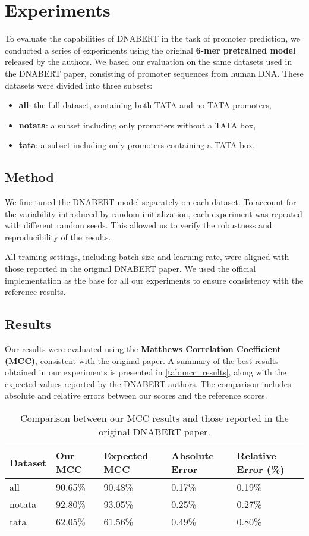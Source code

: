 \section{Experiments}

To evaluate the capabilities of DNABERT in the task of promoter prediction, we conducted a series of experiments using the original \textbf{6-mer pretrained model} released by the authors. We based our evaluation on the same datasets used in the DNABERT paper, consisting of promoter sequences from human DNA. These datasets were divided into three subsets:
\begin{itemize}
\item \textbf{all}: the full dataset, containing both TATA and no-TATA promoters,
\item \textbf{notata}: a subset including only promoters without a TATA box,
\item \textbf{tata}: a subset including only promoters containing a TATA box.
\end{itemize}

\subsection{Method}

We fine-tuned the DNABERT model separately on each dataset. To account for the variability introduced by random initialization, each experiment was repeated with different random seeds. This allowed us to verify the robustness and reproducibility of the results.

All training settings, including batch size and learning rate, were aligned with those reported in the original DNABERT paper. We used the official implementation as the base for all our experiments to ensure consistency with the reference results.

\subsection{Results}

Our results were evaluated using the \textbf{Matthews Correlation Coefficient (MCC)}, consistent with the original paper. A summary of the best results obtained in our experiments is presented in \autoref{tab:mcc_results}, along with the expected values reported by the DNABERT authors. The comparison includes absolute and relative errors between our scores and the reference scores.

\begin{table*}[h!]
\centering
\begin{tabular}{|l|l|l|l|l|}
\hline
Dataset & Our MCC & Expected MCC & Absolute Error & Relative Error (\%) \\
\hline
all & 90.65\% & 90.48\% & 0.17\% & 0.19\% \\
notata & 92.80\% & 93.05\% & 0.25\% & 0.27\% \\
tata & 62.05\% & 61.56\% & 0.49\% & 0.80\% \\
\hline
\end{tabular}
\caption{Comparison between our MCC results and those reported in the original DNABERT paper.}
\label{tab:mcc_results}
\end{table*}

